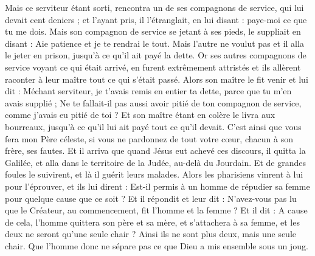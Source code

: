 \begin{multicols}{2}
Mais ce serviteur étant sorti, rencontra un de ses compagnons de service, qui lui devait cent deniers ; et l'ayant pris, il l'étranglait, en lui disant : paye-moi ce que tu me dois.
Mais son compagnon de service se jetant à ses pieds, le suppliait en disant : Aie patience et je te rendrai le tout.
Mais l'autre ne voulut pas et il alla le jeter en prison, jusqu'à ce qu'il ait payé la dette.
Or ses autres compagnons de service voyant ce qui était arrivé, en furent extrêmement attristés et ils allèrent raconter à leur maître tout ce qui s'était passé.
Alors son maître le fit venir et lui dit : Méchant serviteur, je t'avais remis en entier ta dette, parce que tu m'en avais supplié ;
Ne te fallait-il pas aussi avoir pitié de ton compagnon de service, comme j'avais eu pitié de toi ?
Et son maître étant en colère le livra aux bourreaux, jusqu'à ce qu'il lui ait payé tout ce qu'il devait.
C'est ainsi que vous fera mon Père céleste, si vous ne pardonnez de tout votre cœur, chacun à son frère, ses fautes.
\VerseOne{}Et il arriva que quand Jésus eut achevé ces discours, il quitta la Galilée, et alla dans le territoire de la Judée, au-delà du Jourdain.
Et de grandes foules le suivirent, et là il guérit leurs malades.
Alors les pharisiens vinrent à lui pour l'éprouver, et ils lui dirent : Est-il permis à un homme de répudier sa femme pour quelque cause que ce soit ?
Et il répondit et leur dit : N'avez-vous pas lu que le Créateur, au commencement, fit l'homme et la femme ?
Et il dit : A cause de cela, l'homme quittera son père et sa mère, et s'attachera à sa femme, et les deux ne seront qu'une seule chair ?
Ainsi ils ne sont plus deux, mais une seule chair. Que l'homme donc ne sépare pas ce que Dieu a mis ensemble sous un joug.

\end{multicols}
